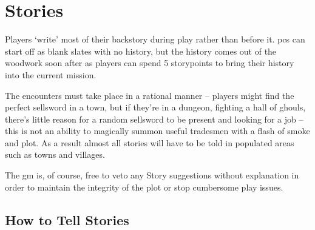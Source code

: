 \chapter[House of Stories]{Stories}
\label{stories}


Players `write' most of their backstory during play rather than before it.
\Glspl{pc} can start off as blank slates with no history, but the history comes out of the woodwork soon after as players can spend 5 \glspl{storypoint} to bring their history into the current mission.

The encounters must take place in a rational manner -- players might find the perfect sellsword in a town, but if they're in a dungeon, fighting a hall of ghouls, there's little reason for a random sellsword to be present and looking for a job -- this is not an ability to magically summon useful tradesmen with a flash of smoke and plot.
As a result almost all stories will have to be told in populated areas such as towns and villages.

The \gls{gm} is, of course, free to veto any Story suggestions without explanation in order to maintain the integrity of the plot or stop cumbersome play issues.

\section{How to Tell Stories}

